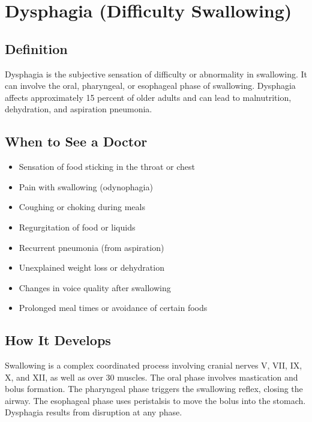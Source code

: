 \chapter{Dysphagia (Difficulty Swallowing)}

\section*{Definition}
Dysphagia is the subjective sensation of difficulty or abnormality in swallowing. It can involve the oral, pharyngeal, or esophageal phase of swallowing. Dysphagia affects approximately 15 percent of older adults and can lead to malnutrition, dehydration, and aspiration pneumonia.

\section*{When to See a Doctor}
\begin{itemize}
\item Sensation of food sticking in the throat or chest
\item Pain with swallowing (odynophagia)
\item Coughing or choking during meals
\item Regurgitation of food or liquids
\item Recurrent pneumonia (from aspiration)
\item Unexplained weight loss or dehydration
\item Changes in voice quality after swallowing
\item Prolonged meal times or avoidance of certain foods
\end{itemize}

\section*{How It Develops}
Swallowing is a complex coordinated process involving cranial nerves V, VII, IX, X, and XII, as well as over 30 muscles. The oral phase involves mastication and bolus formation. The pharyngeal phase triggers the swallowing reflex, closing the airway. The esophageal phase uses peristalsis to move the bolus into the stomach. Dysphagia results from disruption at any phase.

